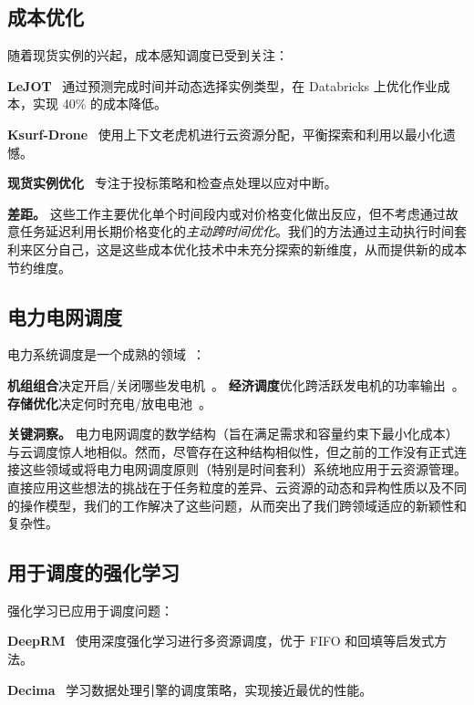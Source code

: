 \documentclass[10pt,a4paper]{article}
\begin{document}
\subsection{成本优化}

随着现货实例的兴起，成本感知调度已受到关注：

\textbf{LeJOT}~\cite{ma2025lejot} 通过预测完成时间并动态选择实例类型，在 Databricks 上优化作业成本，实现 40\% 的成本降低。

\textbf{Ksurf-Drone}~\cite{dangana2025ksurf} 使用上下文老虎机进行云资源分配，平衡探索和利用以最小化遗憾。

\textbf{现货实例优化}~\cite{wang2023spot,li2024bidding,zhang2025checkpointing} 专注于投标策略和检查点处理以应对中断。

\textbf{差距。} 这些工作主要优化单个时间段内或对价格变化做出反应，但不考虑通过故意任务延迟利用长期价格变化的\textit{主动跨时间优化}。我们的方法通过主动执行时间套利来区分自己，这是这些成本优化技术中未充分探索的新维度，从而提供新的成本节约维度。

\subsection{电力电网调度}

电力系统调度是一个成熟的领域~\cite{wood2013power}：

\textbf{机组组合}决定开启/关闭哪些发电机~\cite{padhy2004unit}。
\textbf{经济调度}优化跨活跃发电机的功率输出~\cite{zhu2015optimization}。
\textbf{存储优化}决定何时充电/放电电池~\cite{luo2015overview}。

\textbf{关键洞察。} 电力电网调度的数学结构（旨在满足需求和容量约束下最小化成本）与云调度惊人地相似。然而，尽管存在这种结构相似性，但之前的工作没有正式连接这些领域或将电力电网调度原则（特别是时间套利）系统地应用于云资源管理。直接应用这些想法的挑战在于任务粒度的差异、云资源的动态和异构性质以及不同的操作模型，我们的工作解决了这些问题，从而突出了我们跨领域适应的新颖性和复杂性。

\subsection{用于调度的强化学习}

强化学习已应用于调度问题：

\textbf{DeepRM}~\cite{deeprm2017} 使用深度强化学习进行多资源调度，优于 FIFO 和回填等启发式方法。

\textbf{Decima}~\cite{decima2018} 学习数据处理引擎的调度策略，实现接近最优的性能。
\end{document}
